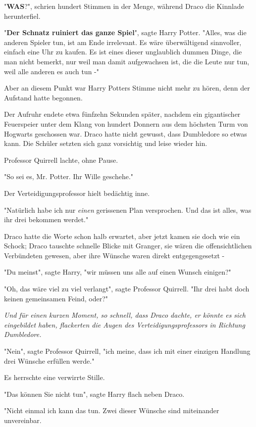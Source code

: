 {"\textbf{WAS}?", schrien hundert Stimmen in der Menge, während Draco die Kinnlade herunterfiel.

"\textbf{Der Schnatz ruiniert das ganze Spiel}", sagte Harry Potter. "Alles, was die anderen Spieler tun, ist am Ende irrelevant. Es wäre überwältigend sinnvoller, einfach eine Uhr zu kaufen. Es ist eines dieser unglaublich dummen Dinge, die man nicht bemerkt, nur weil man damit aufgewachsen ist, die die Leute nur tun, weil alle anderen es auch tun -"

Aber an diesem Punkt war Harry Potters Stimme nicht mehr zu hören, denn der Aufstand hatte begonnen.

Der Aufruhr endete etwa fünfzehn Sekunden später, nachdem ein gigantischer Feuerspeier unter dem Klang von hundert Donnern aus dem höchsten Turm von Hogwarts geschossen war. Draco hatte nicht gewusst, dass Dumbledore so etwas kann. Die Schüler setzten sich ganz vorsichtig und leise wieder hin.

Professor Quirrell lachte, ohne Pause.

"So sei es, Mr. Potter. Ihr Wille geschehe."

Der Verteidigungsprofessor hielt bedächtig inne.

"Natürlich habe ich nur \emph{einen} gerissenen Plan versprochen. Und das ist alles, was ihr drei bekommen werdet."

Draco hatte die Worte schon halb erwartet, aber jetzt kamen sie doch wie ein Schock; Draco tauschte schnelle Blicke mit Granger, sie wären die offensichtlichen Verbündeten gewesen, aber ihre Wünsche waren direkt entgegengesetzt -

"Du meinst", sagte Harry, "wir müssen uns alle auf einen Wunsch einigen?"

"Oh, das wäre viel zu viel verlangt", sagte Professor Quirrell. "Ihr drei habt doch keinen gemeinsamen Feind, oder?"

\emph{Und für einen kurzen Moment, so schnell, dass Draco dachte, er könnte es sich eingebildet haben, flackerten die Augen des Verteidigungsprofessors in Richtung Dumbledore.}

"Nein", sagte Professor Quirrell, "ich meine, dass ich mit einer einzigen Handlung drei Wünsche erfüllen werde."

Es herrschte eine verwirrte Stille.

"Das können Sie nicht tun", sagte Harry flach neben Draco.

"Nicht einmal ich kann das tun. Zwei dieser Wünsche sind miteinander unvereinbar.

}

